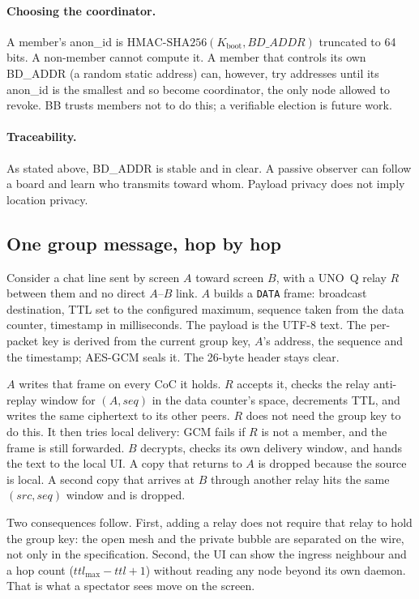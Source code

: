 \documentclass[conference,10pt]{IEEEtran}
\begin{document}
\paragraph{Choosing the coordinator.} A member's anon\_id is
$\mathrm{HMAC\text{-}SHA256}(K_{\mathrm{boot}},\mathit{BD\_ADDR})$
truncated to 64 bits. A non-member cannot compute it. A member that
controls its own BD\_ADDR (a random static address) can, however, try
addresses until its anon\_id is the smallest and so become coordinator,
the only node allowed to revoke. BB trusts members not to do this; a
verifiable election is future work.

\paragraph{Traceability.} As stated above, BD\_ADDR is stable and in
clear. A passive observer can follow a board and learn who transmits
toward whom. Payload privacy does not imply location privacy.

\subsection{One group message, hop by hop}
\label{sec:walk}

Consider a chat line sent by screen $A$ toward screen $B$, with a UNO~Q
relay $R$ between them and no direct $A$--$B$ link. $A$ builds a
\texttt{DATA} frame: broadcast destination, TTL set to the configured
maximum, sequence taken from the data counter, timestamp in milliseconds.
The payload is the UTF-8 text. The per-packet key is derived from the
current group key, $A$'s address, the sequence and the timestamp; AES-GCM
seals it. The 26-byte header stays clear.

$A$ writes that frame on every CoC it holds. $R$ accepts it, checks the
relay anti-replay window for $(A,\mathit{seq})$ in the data counter's
space, decrements TTL, and writes the same ciphertext to its other peers.
$R$ does not need the group key to do this. It then tries local delivery:
GCM fails if $R$ is not a member, and the frame is still forwarded.
$B$ decrypts, checks its own delivery window, and hands the text to the
local UI. A copy that returns to $A$ is dropped because the source is
local. A second copy that arrives at $B$ through another relay hits the
same $(\mathit{src},\mathit{seq})$ window and is dropped.

Two consequences follow. First, adding a relay does not require that
relay to hold the group key: the open mesh and the private bubble are
separated on the wire, not only in the specification. Second, the UI can
show the ingress neighbour and a hop count ($\mathit{ttl}_{\max} -
\mathit{ttl} + 1$) without reading any node beyond its own daemon. That
is what a spectator sees move on the screen.
\end{document}
